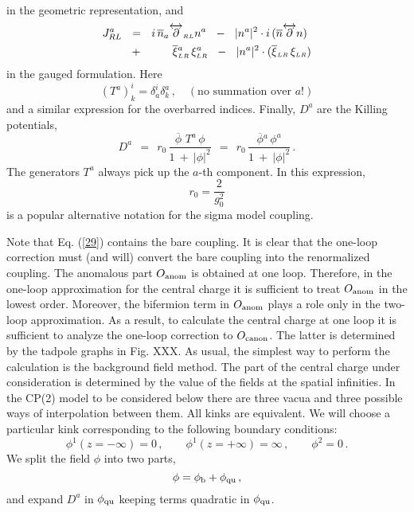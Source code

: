 \documentclass[epsfig,12pt]{article}
\def\beq{\begin{equation}}
\def\eeq{\end{equation}}
\def\beq{\begin{equation}}
\def\eeq{\end{equation}}
\newcommand{\p}{\partial}
\newcommand{\ov}{\overline}
\newcommand{\bphi}{\ov{\phi}{}}
\newcommand{\bxi}{\ov{\xi}{}}
\begin{document}
       in the geometric representation, and
\begin{align}
%
\notag
       J_{RL}^a  & ~~=~~ i\, \ov{n}{}_a \overleftrightarrow{\p}_{\scriptscriptstyle RL} n^a 
                   ~~-~~ |n^a|^2 \cdot i\, ( \ov{n} \overleftrightarrow{\p} n ) \\
%
                 & ~~+~~ \qquad 
                         \bxi{}_{\scriptscriptstyle LR}^a\, \xi_{\scriptscriptstyle LR}^a  ~~-~~
                         |n^a|^2 \cdot ( \bxi{}_{\scriptscriptstyle LR}\, \xi_{\scriptscriptstyle LR} )
\end{align}
       in the gauged formulation. Here
 \beq
 \left(T^a
 \right)^i_k = \delta_a^i\delta^a_k \,,\quad (\mbox{no summation over $a$!})
 \eeq
 and a similar expression for the overbarred indices.
Finally,
       $ D^a $ are the Killing potentials,
\beq
       D^a  ~~=~~ r_0\, \frac{ \bphi\,\, T^a\, \phi } 
                           {  1  ~+~  |\phi|^2  }
            ~~=~~ r_0\, \frac{ \bphi^a\, \phi^a   }
                           {  1  ~+~  |\phi|^2  }\,.
                           \label{29}
\eeq
       The generators $ T^a $ always pick up the $ a $-th component.
       In this expression, 
       \beq
       r _0=\frac{ 2 }{ g_0^2}
        \eeq 
        is a popular alternative notation for the sigma model coupling.
        
        Note that Eq. (\ref{29}) contains the bare coupling. It is clear that the one-loop correction must (and will) convert the bare coupling  into the renormalized coupling. The anomalous part $O_{\rm anom}$ is obtained at one loop.
        Therefore, in the one-loop approximation for the central charge 
        it is sufficient to treat $O_{\rm anom}$ in the lowest order. Moreover, the bifermion term 
        in $O_{\rm anom}$ plays a role only in the two-loop approximation. As a result, to calculate the central charge at one loop it is sufficient to analyze 
        the one-loop correction to $O_{\rm canon}$. The latter is determined by the tadpole graphs in Fig. XXX. As usual, the simplest way to perform the calculation is the background field method.
The part of the central charge under consideration is determined by the value of the fields at the spatial infinities. 
In the CP(2) model to be considered below there are three vacua and three possible ways
of interpolation between them. All kinks are equivalent. We will choose a  particular kink
corresponding to the following boundary conditions:
\beq
\phi^1 (z=-\infty ) = 0\,,\qquad \phi^1 (z=+\infty ) = \infty\,,\qquad  \phi^2 = 0\,.
\label{211}
\eeq
We split the field $\phi$ into two parts,
\beq
\phi = \phi_{\rm b} + \phi_{\rm qu}\,,
\label{212}
\eeq
 and expand $D^a$ in $\phi_{\rm qu}$ keeping  terms quadratic in $\phi_{\rm qu}$.
 
\end{document}
